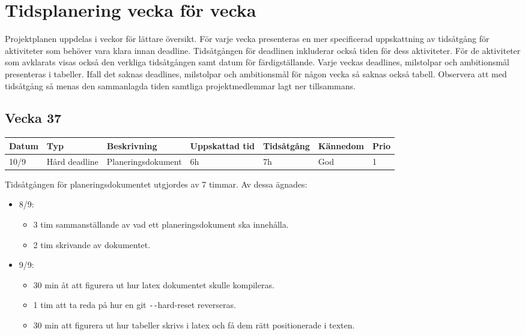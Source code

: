 \documentclass{TDP003mall}
\begin{document}
\section{Tidsplanering vecka för vecka}
Projektplanen uppdelas i veckor för lättare översikt. För varje vecka presenteras
 en mer specificerad uppskattning av tidsåtgång för aktiviteter som behöver vara
 klara innan deadline. Tidsåtgången för deadlinen inkluderar också tiden för dess
 aktiviteter. För de aktiviteter som avklarats visas också den verkliga tidsåtgången
 samt datum för färdigställande. Varje veckas deadlines, milstolpar och ambitionsmål presenteras
 i tabeller. Ifall det saknas deadlines, milstolpar och ambitionsmål för någon vecka så saknas också tabell. Observera att med tidsåtgång så menas den sammanlagda tiden samtliga projektmedlemmar lagt ner tillsammans.

\subsection{Vecka 37}
\begin{tabularx}{\linewidth}{|l|l|X|l|l|l|l|}
	\hline
	Datum & Typ           & Beskrivning        & Uppskattad tid & Tidsåtgång & Kännedom & Prio \\ [0.5ex]
	\hline                                             
	10/9  & Hård deadline & Planeringsdokument & 6h             & 7h         & God      & 1    \\
	\hline
\end{tabularx}

Tidsåtgången för planeringsdokumentet utgjordes av 7 timmar. Av dessa ägnades:
\begin{itemize}
	\item 8/9:
	\begin{itemize}
		\item 3 tim sammanställande av vad ett planeringsdokument ska innehålla.
		\item 2 tim skrivande av dokumentet.
	\end{itemize}
	\item 9/9:
	\begin{itemize}
		\item 30 min åt att figurera ut hur latex dokumentet skulle kompileras.
		\item 1 tim att ta reda på hur en git \texttt{-{}-}hard-reset reverseras.
		\item 30 min att figurera ut hur tabeller skrivs i latex och få dem rätt positionerade i texten.\\
	\end{itemize}

      \end{itemize}
\end{document}
